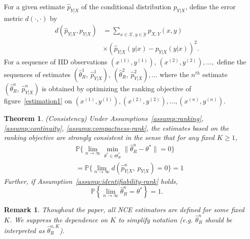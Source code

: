 \documentclass[11pt,a4paper]{article}
\newcommand{\wh}[1]{\widehat{#1}}
\newtheorem{theorem}{Theorem}[section]
\newtheorem{remark}{Remark}[section]
\begin{document}
For a given estimate $\wh{p}_{Y|X}$ of the conditional distribution $p_{Y|X}$, define the error metric $d(\cdot, \cdot)$ by 
\begin{equation*}
\begin{aligned}
 d \left(\wh{p}_{Y|X}, p_{Y|X}\right) & = \sum_{x\in\mathcal{X}, y\in\mathcal{Y}} p_{X, Y}(x, y)
\\
& \times \left(\wh{p}_{Y|X}(y|x) - p_{Y|X}(y|x)\right)^2. 
\end{aligned}
\end{equation*}
For a sequence of IID observations $(x^{(1)}, y^{(1)})$, $(x^{(2)}, y^{(2)}), \ldots, $ define the sequences of estimates
$(\wh{\theta}_R^1, ~\wh{p}^1_{Y|X}), ~(\wh{\theta}_R^2, ~\wh{p}^2_{Y|X}), \ldots$ where the $n^{th}$ estimate $(\wh{\theta}_R^n, ~\wh{p}^n_{Y|X})$ is obtained by optimizing the ranking objective of figure~\ref{estimation1} on $(x^{(1)}, y^{(1)}), (x^{(2)}, y^{(2)}),
\ldots, (x^{(n)}, y^{(n)})$.
\begin{theorem}
  (Consistency) Under Assumptions~\ref{assump:ranking}, \ref{assump:continuity}, \ref{assump:compactness-rank}, the
  estimates based on the ranking objective are strongly consistent in the
  sense that for any fixed $K \geq 1$,
  \begin{equation*}
  \begin{aligned}
 & \mathbb{P} \Big\{\lim_{n\rightarrow \infty} \min_{\theta^*\in\Theta^*_R}\| \wh{\theta}^n_R - \theta^*\| = 0 \Big\}  \\
& = \mathbb{P} \Big\{\lim_{n\rightarrow \infty} d \left(\wh{p}^n_{Y|X},~ p_{Y|X}\right) = 0  \Big\}  = 1 
  \end{aligned}
  \end{equation*}
Further, if Assumption~\ref{assump:identifiability-rank} holds, 
\[
\mathbb{P} \left\{\lim\limits_{n\rightarrow \infty} \wh{\theta}^n_R = \theta^* \right\} = 1.
\]
\label{thm:consistency-rank}
\end{theorem}

\begin{remark}
Thoughout the paper, all NCE estimators are defined for some fixed $K$. We suppress the dependence on $K$ to simplify notation (e.g. $\wh{\theta}^n_R$ should be interpreted as $\wh{\theta}^{n, K}_{R}$).
\end{remark}
\end{document}
